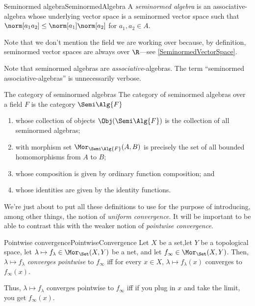 \begin{dfn}{Seminormed algebra}{SeminormedAlgebra}
A \emph{seminormed algebra} is an associative-algebra whose underlying vector space is a seminormed vector space such that $\norm[a_1a_2]\leq \norm[a_1]\norm[a_2]$ for $a_1,a_2\in A$.
\begin{rmk}
Note that we don't mention the field we are working over because, by definition, seminormed vector spaces are always over $\R$---see \cref{SeminormedVectorSpace}.
\end{rmk}
\begin{rmk}
Note that seminormed algebras are \emph{associative}-algebras.  The term ``seminormed associative-algebras'' is unnecessarily verbose.
\end{rmk}
\end{dfn}
\begin{exm}{The category of seminormed algebras}{}
The category of seminormed algebras over a field $F$ is the category $\Semi \Alg{F}$
\begin{enumerate}
\item whose collection of objects $\Obj (\Semi \Alg{F})$ is the collection of all seminormed algebras;
\item with morphism set $\Mor _{\Semi \Alg{F}}(A,B)$ is precisely the set of all bounded homomorphisms from $A$ to $B$;
\item whose composition is given by ordinary function composition; and
\item whose identities are given by the identity functions.
\end{enumerate}
\end{exm}
We're just about to put all these definitions to use for the purpose of introducing, among other things, the notion of \emph{uniform convergence}.  It will be important to be able to contrast this with the weaker notion of \emph{pointwise convergence}.
\begin{dfn}{Pointwise convergence}{PointwiseConvergence}
Let $X$ be a set,let $Y$ be a topological space, let $\lambda \mapsto f_{\lambda}\in \Mor _{\Set}(X,Y)$ be a net, and let $f_{\infty}\in \Mor _{\Set}(X,Y)$.  Then, $\lambda \mapsto f_{\lambda}$ \emph{converges pointwise} to $f_{\infty}$ iff for every $x\in X$, $\lambda \mapsto f_{\lambda}(x)$ converges to $f_{\infty}(x)$.
\begin{rmk}
Thus, $\lambda \mapsto f_{\lambda}$ converges pointwise to $f_{\infty}$ iff if you plug in $x$ and take the limit, you get $f_{\infty}(x)$.
\end{rmk}
\end{dfn}
